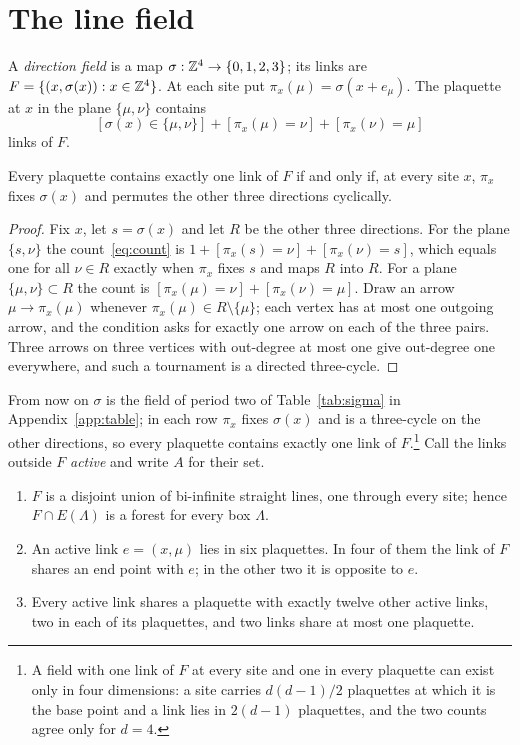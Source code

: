 \section{The line field}\label{sec:linefield}

A \emph{direction field} is a map $\sigma:\mathbb{Z}^4\to\{0,1,2,3\}$; its links
are $F=\{(x,\sigma(x)):x\in\mathbb{Z}^4\}$. At each site put $\pi_x(\mu)=
\sigma(x+e_\mu)$. The plaquette at $x$ in the plane $\{\mu,\nu\}$ contains
\begin{equation}\label{eq:count}
[\sigma(x)\in\{\mu,\nu\}]+[\pi_x(\mu)=\nu]+[\pi_x(\nu)=\mu]
\end{equation}
links of $F$.

\begin{lemma}\label{lem:cycle}
Every plaquette contains exactly one link of $F$ if and only if, at every
site $x$, $\pi_x$ fixes $\sigma(x)$ and permutes the other three directions
cyclically.
\end{lemma}

\begin{proof}
Fix $x$, let $s=\sigma(x)$ and let $R$ be the other three directions. For the
plane $\{s,\nu\}$ the count~\eqref{eq:count} is $1+[\pi_x(s)=\nu]+[\pi_x(\nu)
=s]$, which equals one for all $\nu\in R$ exactly when $\pi_x$ fixes $s$ and
maps $R$ into $R$. For a plane $\{\mu,\nu\}\subset R$ the count is
$[\pi_x(\mu)=\nu]+[\pi_x(\nu)=\mu]$. Draw an arrow $\mu\to\pi_x(\mu)$ whenever
$\pi_x(\mu)\in R\setminus\{\mu\}$; each vertex has at most one outgoing arrow,
and the condition asks for exactly one arrow on each of the three pairs. Three
arrows on three vertices with out-degree at most one give out-degree one
everywhere, and such a tournament is a directed three-cycle.
\end{proof}

From now on $\sigma$ is the field of period two of Table~\ref{tab:sigma} in
Appendix~\ref{app:table}; in each row $\pi_x$ fixes $\sigma(x)$ and is a
three-cycle on the other directions, so every plaquette contains exactly one
link of $F$.\footnote{A field with one link of $F$ at every site and one in
every plaquette can exist only in four dimensions: a site carries
$d(d-1)/2$ plaquettes at which it is the base point and a link lies in
$2(d-1)$ plaquettes, and the two counts agree only for $d=4$.} Call the links
outside $F$ \emph{active} and write $A$ for their set.

\begin{lemma}\label{lem:structure}\leavevmode
\begin{enumerate}[label=\textup{(\roman*)},leftmargin=*]
\item $F$ is a disjoint union of bi-infinite straight lines, one through every
site; hence $F\cap E(\Lambda)$ is a forest for every box $\Lambda$.
\item An active link $e=(x,\mu)$ lies in six plaquettes. In four of them the
link of $F$ shares an end point with $e$; in the other two it is opposite to
$e$.
\item Every active link shares a plaquette with exactly twelve other active
links, two in each of its plaquettes, and two links share at most one
plaquette.
\end{enumerate}
\end{lemma}

